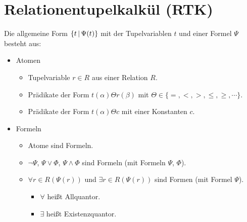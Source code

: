     \section{Relationentupelkalkül (RTK)} %
        Die allgemeine Form \( \{ t \,\vert\, \Psi(t) \} \) mit der Tupelvariablen \(t\) und einer Formel \(\Psi\) besteht aus:
        \begin{itemize}
        	\item Atomen
        		\begin{itemize}
        			\item Tupelvariable \( r \in R \) aus einer Relation \(R\).
        			\item Prädikate der Form \( t(\alpha) \Theta r(\beta) \) mit \( \Theta \in \{ =, <, >, \leq, \geq, \cdots \} \).
        			\item Prädikate der Form \( t(\alpha) \Theta c \) mit einer Konstanten \(c\).
        		\end{itemize}
        	\item Formeln
        		\begin{itemize}
        			\item Atome sind Formeln.
        			\item \( \lnot\Psi \), \( \Psi \lor \Phi \), \( \Psi \land \Phi \) sind Formeln (mit Formeln \(\Psi\), \(\Phi\)).
        			\item \( \forall r \in R (\Psi(r)) \) und \( \exists r \in R (\Psi(r)) \) sind Formen (mit Formel \(\Psi\)).
        				\begin{itemize}
        					\item \( \forall \) heißt Allquantor.
        					\item \( \exists \) heißt Existenzquantor.
        				\end{itemize}
        		\end{itemize}
        \end{itemize}

